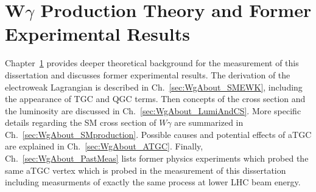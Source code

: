 \section{W$\gamma$ Production Theory and Former Experimental Results} %
\label{sec:WgAbout}

Chapter~\ref{sec:WgAbout} provides deeper theoretical background for the measurement of this dissertation and discusses former experimental results. The derivation of the electroweak Lagrangian is described in Ch.~\ref{sec:WgAbout_SMEWK}, including the appearance of TGC and QGC terms. Then concepts of the cross section and the luminosity are discussed in Ch.~\ref{sec:WgAbout_LumiAndCS}. More specific details regarding the SM cross section of $W\gamma$ are summarized in Ch.~\ref{sec:WgAbout_SMproduction}. Possible causes and potential effects of aTGC are explained in Ch.~\ref{sec:WgAbout_ATGC}. Finally, Ch.~\ref{sec:WgAbout_PastMeas} lists former physics experiments which probed the same aTGC vertex which is probed in the measurement of this dissertation including measurments of exactly the same process at lower LHC beam energy.\\

